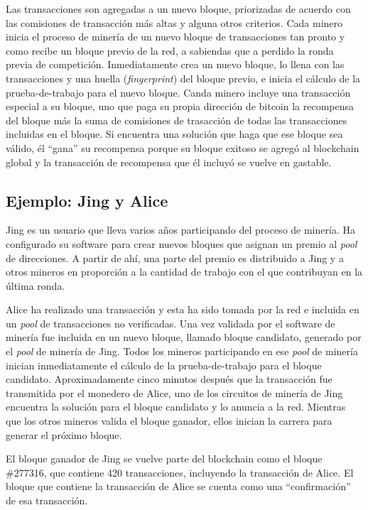 \documentclass[10pt,journal,compsoc]{IEEEtran}
\begin{document}
Las transacciones son agregadas a un nuevo bloque, priorizadas de acuerdo con las comisiones de transacción más altas y alguna otros criterios. Cada minero inicia el proceso de minería de un nuevo bloque de transacciones tan pronto y como recibe un bloque previo de la red, a sabiendas que a perdido la ronda previa de competición. Inmediatamente crea un nuevo bloque, lo llena con las transacciones y una huella (\emph{fingerprint}) del bloque previo, e inicia el cálculo de la prueba-de-trabajo para el nuevo bloque. Canda minero incluye una transacción especial a su bloque, uno que paga su propia dirección de bitcoin la recompensa del bloque más la suma de comisiones de trasacción de todas las transacciones incluidas en el bloque. Si encuentra una solución que haga que ese bloque sea válido, él ``gana'' su recompensa porque su bloque exitoso se agregó al blockchain global y la transacción de recompensa que él incluyó se vuelve en gastable.

\subsection{Ejemplo: Jing y Alice}
Jing es un usuario que lleva varios años participando del proceso de minería. Ha configurado su software para crear nuevos bloques que asignan un premio al \emph{pool} de direcciones. A partir de ahí, una parte del premio es distribuido a Jing y a otros mineros en proporción a la cantidad de trabajo con el que contribuyan en la última ronda.

Alice ha realizado una transacción y esta ha sido tomada por la red e incluida en un \emph{pool} de transacciones no verificadas. Una vez validada por el software de minería fue incluida en un nuevo bloque, llamado bloque candidato, generado por el \emph{pool} de minería de Jing. Todos los mineros participando en ese \emph{pool} de minería inician inmediatamente el cálculo de la prueba-de-trabajo para el bloque candidato. Aproximadamente cinco minutos después que la transacción fue transmitida por el monedero de Alice, uno de los circuitos de minería de Jing encuentra la solución para el bloque candidato y lo anuncia a la red. Mientras que los otros mineros valida el bloque ganador, ellos inician la carrera para generar el próximo bloque.


El bloque ganador de Jing se vuelve parte del blockchain como el bloque \#277316, que contiene 420 transacciones, incluyendo la transacción de Alice. El bloque que contiene la transacción de Alice se cuenta como una ``confirmación'' de esa transacción.
\end{document}
